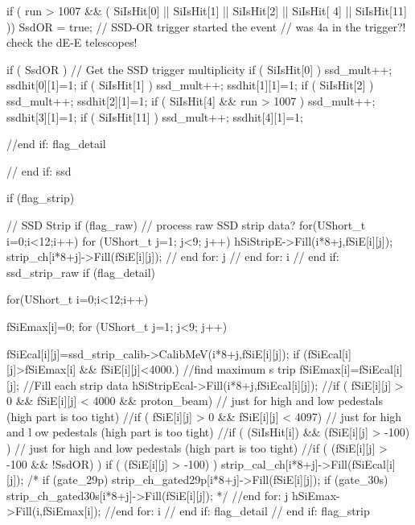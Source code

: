 \begin{DoxyCode}
{{{{{{          if ( run > 1007 && ( SiIsHit[0] || SiIsHit[1] || SiIsHit[2] || SiIsHit[
      4] || SiIsHit[11] )) SsdOR = true; // SSD-OR trigger started the event
          // was 4a in the trigger?!  check the dE-E telescopes!

          if ( SsdOR ) { // Get the SSD trigger multiplicity
            if ( SiIsHit[0] ) {
              ssd_mult++;
              ssdhit[0][1]=1;
            }
            if ( SiIsHit[1] ) {
              ssd_mult++;
              ssdhit[1][1]=1;
            }
            if ( SiIsHit[2] ) {
              ssd_mult++;
              ssdhit[2][1]=1;
            }
            if ( SiIsHit[4] && run > 1007 ) {
              ssd_mult++;
              ssdhit[3][1]=1;
            }
            if ( SiIsHit[11] ) {
              ssd_mult++;
              ssdhit[4][1]=1;
            }
          }
        }//end if: flag_detail
      } // end if: ssd
     
     if (flag_strip){
        // SSD Strip
        if (flag_raw) { // process raw SSD strip data?
          for(UShort_t i=0;i<12;i++){
            for (UShort_t j=1; j<9; j++) {
              hSiStripE->Fill(i*8+j,fSiE[i][j]);
              strip_ch[i*8+j]->Fill(fSiE[i][j]); 
            } // end for: j
          } // end for: i
        } // end if: ssd_strip_raw
        if (flag_detail){
          for(UShort_t i=0;i<12;i++){
            fSiEmax[i]=0;
            for (UShort_t j=1; j<9; j++) {
              fSiEcal[i][j]=ssd_strip_calib->CalibMeV(i*8+j,fSiE[i][j]);
              if (fSiEcal[i][j]>fSiEmax[i] && fSiE[i][j]<4000.) {//find maximum s
      trip
                fSiEmax[i]=fSiEcal[i][j];
              }
              //Fill each strip data 
              hSiStripEcal->Fill(i*8+j,fSiEcal[i][j]);
              //if ( fSiE[i][j] > 0 && fSiE[i][j] < 4000 && proton_beam){ // just
       for high and low pedestals (high part is too tight)
              //if ( fSiE[i][j] > 0 && fSiE[i][j] < 4097){ // just for high and l
      ow pedestals (high part is too tight)
              //if ( (SiIsHit[i]) && (fSiE[i][j] > -100) ){ // just for high and 
      low pedestals (high part is too tight)
              //if ( (fSiE[i][j] > -100 && !SsdOR) ){
              if ( (fSiE[i][j] > -100) ){
                strip_cal_ch[i*8+j]->Fill(fSiEcal[i][j]);
              }
              /*
              if (gate_29p) {
                 strip_ch_gated29p[i*8+j]->Fill(fSiE[i][j]);
              }
              if (gate_30s) {
                 strip_ch_gated30s[i*8+j]->Fill(fSiE[i][j]);
              }*/
            } //end for: j
            hSiEmax->Fill(i,fSiEmax[i]);
          } //end for: i
        } // end if: flag_detail 
      } // end if: flag_strip

}}}}}}}}
\end{DoxyCode}
